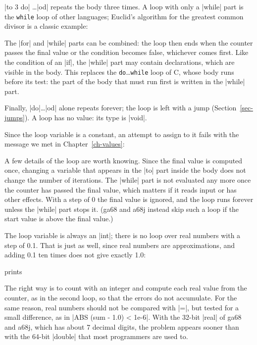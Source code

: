 
\code|to 3 do| \ldots \code|od| repeats the body three times. A loop with
only a \code|while| part is the \texttt{while} loop of other languages;
Euclid's algorithm for the greatest common divisor is a classic example:


The \code|for| and \code|while| parts can be combined: the loop then ends
when the counter passes the final value or the condition becomes false,
whichever comes first. Like the condition of an \code|if|, the
\code|while| part may contain declarations, which are visible in the
body. This replaces the \texttt{do}\ldots\texttt{while} loop of C, whose
body runs before its test: the part of the body that must run first is
written in the \code|while| part.


Finally, \code|do|\ldots\code|od| alone repeats forever; the loop is left
with a jump (Section~\ref{sec-jumps}). A loop has no value: its type is
\code|void|.

Since the loop variable is a constant, an attempt to assign to it fails
with the message we met in Chapter~\ref{ch-values}:


A few details of the loop are worth knowing. Since the final value is
computed once, changing a variable that appears in the \code|to| part
inside the body does not change the number of iterations. The
\code|while| part is not evaluated any more once the counter has passed
the final value, which matters if it reads input or has other effects.
With a step of 0 the final value is ignored, and the loop runs forever
unless the \code|while| part stops it. (ga68 and a68j instead skip such
a loop if the start value is above the final value.)

The loop variable is always an \code|int|; there is no loop over real
numbers with a step of 0.1. That is just as well, since real numbers are
approximations, and adding 0.1 ten times does not give exactly 1.0:


\noindent prints

The right way is to count with an integer and compute each real value
from the counter, as in the second loop, so that the errors do not
accumulate. For the same reason, real numbers should not be compared with
\code|=|, but tested for a small difference, as in
\code|ABS (sum - 1.0) < 1e-6|. With the 32-bit \code|real| of ga68 and
a68j, which has about 7 decimal digits, the problem appears sooner than
with the 64-bit \code|double| that most programmers are used to.

